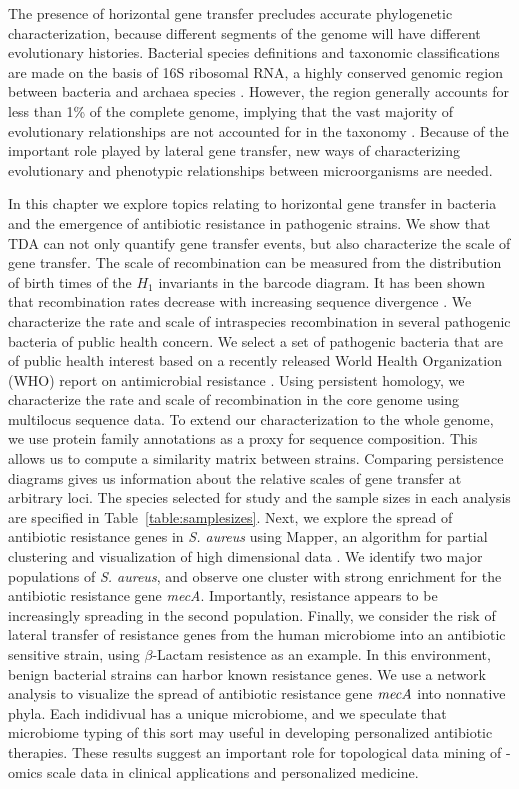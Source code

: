 The presence of horizontal gene transfer precludes accurate phylogenetic characterization, because different segments of the genome will have different evolutionary histories.
Bacterial species definitions and taxonomic classifications are made on the basis of 16S ribosomal RNA, a highly conserved genomic region between bacteria and archaea species \cite{Woese:1977vd}.
However, the region generally accounts for less than 1\% of the complete genome, implying that the vast majority of evolutionary relationships are not accounted for in the taxonomy \cite{Dagan:2006up}.
Because of the important role played by lateral gene transfer, new ways of characterizing evolutionary and phenotypic relationships between microorganisms are needed.

In this chapter we explore topics relating to horizontal gene transfer in bacteria and the emergence of antibiotic resistance in pathogenic strains.
We show that TDA can not only quantify gene transfer events, but also characterize the scale of gene transfer.
The scale of recombination can be measured from the distribution of birth times of the $H_1$ invariants in the barcode diagram.
It has been shown that recombination rates decrease with increasing sequence divergence \cite{Fraser:2007ep}.
We characterize the rate and scale of intraspecies recombination in several pathogenic bacteria of public health concern.
We select a set of pathogenic bacteria that are of public health interest based on a recently released World Health Organization (WHO) report on antimicrobial resistance \cite{WHO:2014wa}.
Using persistent homology, we characterize the rate and scale of recombination in the core genome using multilocus sequence data.
To extend our characterization to the whole genome, we use protein family annotations as a proxy for sequence composition.
This allows us to compute a similarity matrix between strains.
Comparing persistence diagrams gives us information about the relative scales of gene transfer at arbitrary loci.
The species selected for study and the sample sizes in each analysis are specified in Table~\ref{table:samplesizes}.
Next, we explore the spread of antibiotic resistance genes in \emph{S. aureus} using Mapper, an algorithm for partial clustering and visualization of high dimensional data \cite{Singh:2007ve}.
We identify two major populations of \emph{S. aureus}, and observe one cluster with strong enrichment for the antibiotic resistance gene \emph{mecA}.
Importantly, resistance appears to be increasingly spreading in the second population.
Finally, we consider the risk of lateral transfer of resistance genes from the human microbiome into an antibiotic sensitive strain, using $\beta$-Lactam resistence as an example.
In this environment, benign bacterial strains can harbor known resistance genes.
We use a network analysis to visualize the spread of antibiotic resistance gene $\emph{mecA}$ into nonnative phyla.
Each indidivual has a unique microbiome, and we speculate that microbiome typing of this sort may useful in developing personalized antibiotic therapies.
These results suggest an important role for topological data mining of -omics scale data in clinical applications and personalized medicine.

